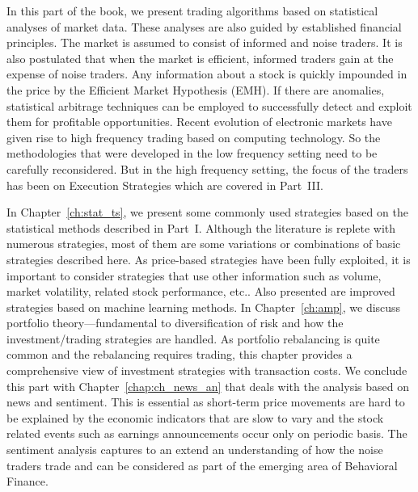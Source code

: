 
In this part of the book, we present trading algorithms based on statistical analyses of market data. These analyses are also guided by established financial principles. The market is assumed to consist of informed and noise traders. It is also postulated that when the market is efficient, informed traders gain at the expense of noise traders. Any information about a stock is quickly impounded in the price by the Efficient Market Hypothesis (EMH). If there are anomalies, statistical arbitrage techniques can be employed to successfully detect and exploit them for profitable opportunities. Recent evolution of electronic markets have given rise to high frequency trading based on computing technology. So the methodologies that were developed in the low frequency setting need to be carefully reconsidered. But in the high frequency setting, the focus of the traders has been on Execution Strategies which are covered in Part~III.


In Chapter~\ref{ch:stat_ts}, we present some commonly used strategies based on the statistical methods described in Part~I. Although the literature is replete with numerous strategies, most of them are some variations or combinations of basic strategies described here. As price-based strategies have been fully exploited, it is important to consider strategies that use other information such as volume, market volatility, related stock performance, etc.. Also presented are improved strategies based on machine learning methods. In Chapter~\ref{ch:amp}, we discuss portfolio theory---fundamental to diversification of risk and how the investment/trading strategies are handled. As portfolio rebalancing is quite common and the rebalancing requires trading, this chapter provides a comprehensive view of investment strategies with transaction costs. We conclude this part with Chapter~\ref{chap:ch_news_an} that deals with the analysis based on news and sentiment. This is essential as short-term price movements are hard to be explained by the economic indicators that are slow to vary and the stock related events such as earnings announcements occur only on periodic basis. The sentiment analysis captures to an extend an understanding of how the noise traders trade and can be considered as part of the emerging area of Behavioral Finance. 